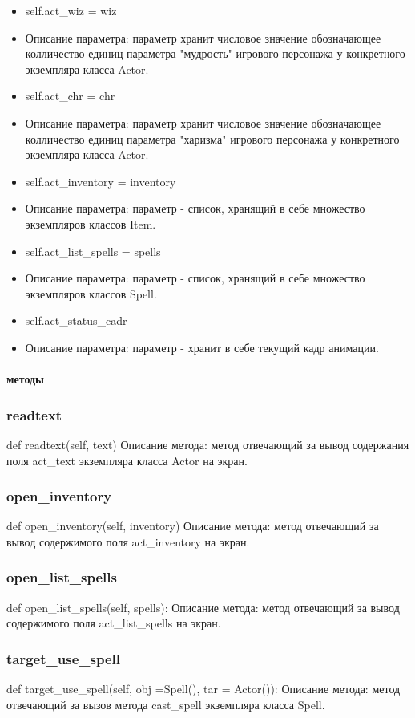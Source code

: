 \begin{itemize}
	\item self.act\_wiz = wiz 
	\item Описание параметра: параметр хранит числовое значение обозначающее колличество единиц параметра "мудрость" игрового персонажа у конкретного экземпляра класса Actor.
	\item self.act\_chr = chr
	\item Описание параметра: параметр хранит числовое значение обозначающее колличество единиц параметра "харизма" игрового персонажа у конкретного экземпляра класса Actor.
	\item self.act\_inventory = inventory
	\item Описание параметра: параметр - список, хранящий в себе множество экземпляров классов Item.
	\item self.act\_list\_spells = spells
	\item Описание параметра: параметр - список, хранящий в себе множество экземпляров классов Spell.
	\item self.act\_status\_cadr
	\item Описание параметра: параметр - хранит в себе текущий кадр анимации.
\end{itemize}
\paragraph{методы}
\subsubsection{readtext}
def readtext(self, text)
Описание метода: метод отвечающий за вывод содержания поля act\_text экземпляра класса Actor на экран.
\subsubsection{open\_inventory}
def open\_inventory(self, inventory)
Описание метода:  метод отвечающий за вывод содержимого поля act\_inventory на экран.
\subsubsection{open\_list\_spells}
def open\_list\_spells(self, spells):
Описание метода: метод отвечающий за вывод содержимого поля act\_list\_spells на экран.
\subsubsection{target\_use\_spell}
def target\_use\_spell(self, obj =Spell(), tar = Actor()):
Описание метода: метод отвечающий за вызов метода cast\_spell экземпляра класса Spell.
